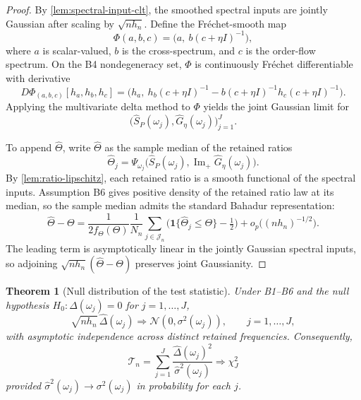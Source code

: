 \documentclass[11pt]{article}
\newtheorem{theorem}{Theorem}[section]
\newcommand{\cT}{\mathcal{T}}
\newcommand{\ImPart}{\operatorname{Im}_{\!+}}
\newcommand{\REV}{}
\begin{document}
\begin{proof}
\REV
By \cref{lem:spectral-input-clt}, the smoothed spectral inputs are jointly Gaussian after scaling by $\sqrt{n h_n}$. Define the Fr\'echet-smooth map
\[
  \Phi(a,b,c)=\big(a,\ b(c+\eta I)^{-1}\big),
\]
where $a$ is scalar-valued, $b$ is the cross-spectrum, and $c$ is the order-flow spectrum. On the B4 nondegeneracy set, $\Phi$ is continuously Fr\'echet differentiable with derivative
\[
  D\Phi_{(a,b,c)}[h_a,h_b,h_c]
  =
  \Big(h_a,\ h_b(c+\eta I)^{-1}-b(c+\eta I)^{-1}h_c(c+\eta I)^{-1}\Big).
\]
Applying the multivariate delta method to $\Phi$ yields the joint Gaussian limit for
\[
  \big(\widehat S_P(\omega_j),\widehat G_\eta(\omega_j)\big)_{j=1}^J.
\]

To append $\widehat\Theta$, write $\widehat\Theta$ as the sample median of the
retained ratios
\[
  \widehat\Theta_j
  =
  \Psi_{\omega_j}\!\big(\widehat S_P(\omega_j),\ImPart \widehat G_\eta(\omega_j)\big).
\]
By \cref{lem:ratio-lipschitz}, each retained ratio is a smooth functional of
the spectral inputs. Assumption B6 gives positive density of the retained ratio
law at its median, so the sample median admits the standard Bahadur
representation:
\[
  \widehat\Theta-\Theta
  =
  \frac{1}{2 f_\Theta(\Theta)}\frac{1}{N_n}\sum_{j\in\mathcal J_n}
  \Big(\mathbf 1\{\widehat\Theta_j\le \Theta\}-\tfrac12\Big)
  +
  o_p\!\big((n h_n)^{-1/2}\big).
\]
The leading term is asymptotically linear in the jointly Gaussian spectral inputs, so adjoining $\sqrt{n h_n}(\widehat\Theta-\Theta)$ preserves joint Gaussianity.
\end{proof}

\begin{theorem}[Null distribution of the test statistic]\label{thm:null-chi-square}\REV
Under B1--B6 and the null hypothesis $H_0:\Delta(\omega_j)=0$ for $j=1,\dots,J$,
\[
  \sqrt{n h_n}\,\widehat{\Delta}(\omega_j)\Rightarrow \mathcal N(0,\sigma^2(\omega_j)),
  \qquad j=1,\dots,J,
\]
with asymptotic independence across distinct retained frequencies. Consequently,
\[
  \cT_n=\sum_{j=1}^J \frac{\widehat{\Delta}(\omega_j)^2}{\widehat{\sigma}^2(\omega_j)}
  \Rightarrow
  \chi_J^2
\]
  provided $\widehat{\sigma}^2(\omega_j)\to \sigma^2(\omega_j)$ in probability for each $j$.
\end{theorem}
\end{document}
